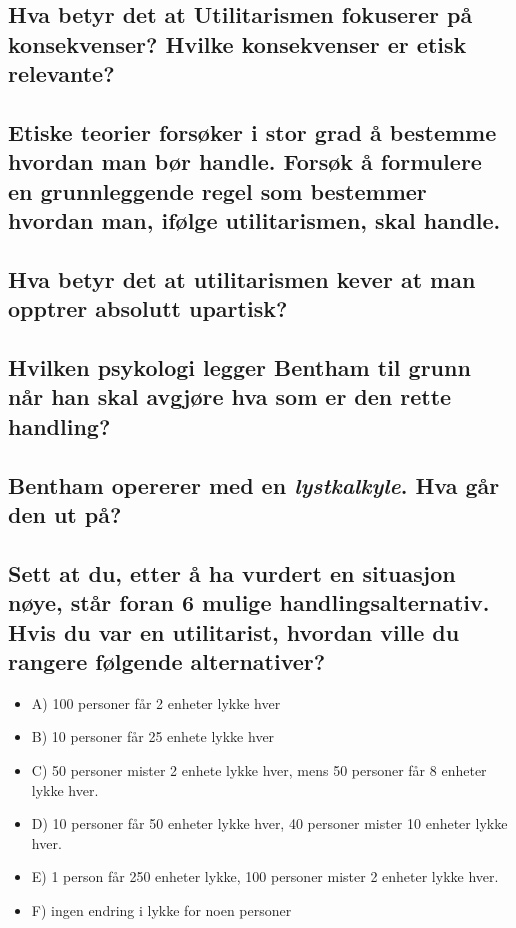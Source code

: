 \documentclass[11pt]{article}
\begin{document}
\subsection{Hva betyr det at Utilitarismen fokuserer på konsekvenser? Hvilke konsekvenser er etisk relevante?}

\subsection{Etiske teorier forsøker i stor grad å bestemme hvordan man bør handle. Forsøk å formulere en grunnleggende regel som bestemmer hvordan man, ifølge utilitarismen, skal handle.}

\subsection{Hva betyr det at utilitarismen kever at man opptrer absolutt upartisk?}

\subsection{Hvilken psykologi legger Bentham til grunn når han skal avgjøre hva som er den rette handling?}

\subsection{Bentham opererer med en \emph{lystkalkyle}. Hva går den ut på?}
\subsection{Sett at du, etter å ha vurdert en situasjon nøye, står foran 6 mulige handlingsalternativ. Hvis du var en utilitarist, hvordan ville du rangere følgende alternativer?}
\begin{itemize}
\item{A) 100 personer får 2 enheter lykke hver}
\item{B) 10 personer får 25 enhete lykke hver}
\item{C) 50 personer mister 2 enhete lykke hver, mens 50 personer får 8 enheter lykke hver.}
\item{D) 10 personer får 50 enheter lykke hver, 40 personer mister 10 enheter lykke hver.}
\item{E) 1 person får 250 enheter lykke, 100 personer mister 2 enheter lykke hver.}
\item{F) ingen endring i lykke for noen personer}
\end{itemize}
\end{document}

